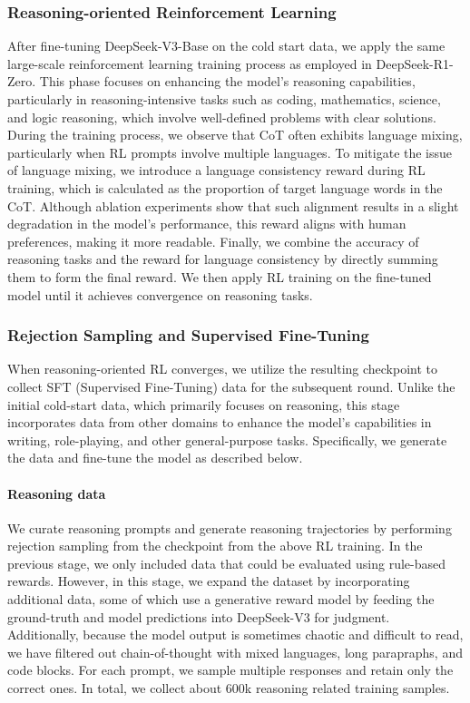 \documentclass[11pt, a4paper, logo, copyright, nonumbering]{deepseek}
\newcommand{\dsro}{DeepSeek-R1-Zero}
\begin{document}
\subsubsection{Reasoning-oriented Reinforcement Learning}
After fine-tuning DeepSeek-V3-Base on the cold start data, we apply the same large-scale reinforcement learning training process as employed in \dsro. This phase focuses on enhancing the model's reasoning capabilities, particularly in reasoning-intensive tasks such as coding, mathematics, science, and logic reasoning, which involve well-defined problems with clear solutions. During the training process, we observe that CoT often exhibits language mixing, particularly when RL prompts involve multiple languages. To mitigate the issue of language mixing, we introduce a language consistency reward during RL training, which is calculated as the proportion of target language words in the CoT. Although ablation experiments show that such alignment results in a slight degradation in the model's performance, this reward aligns with human preferences, making it more readable. Finally, we combine the accuracy of reasoning tasks and the reward for language consistency by directly summing them to form the final reward. We then apply RL training on the fine-tuned model until it achieves convergence on reasoning tasks.

\subsubsection{Rejection Sampling and Supervised Fine-Tuning}
When reasoning-oriented RL converges, we utilize the resulting checkpoint to collect SFT (Supervised Fine-Tuning) data for the subsequent round. Unlike the initial cold-start data, which primarily focuses on reasoning, this stage incorporates data from other domains to enhance the model's capabilities in writing, role-playing, and other general-purpose tasks. Specifically, we generate the data and fine-tune the model as described below.
\label{sec:method:r1:sft}


\paragraph{Reasoning data}
We curate reasoning prompts and generate reasoning trajectories by performing rejection sampling from the checkpoint from the above RL training.
In the previous stage, we only included data that could be evaluated using rule-based rewards. However, in this stage, we expand the dataset by incorporating additional data, some of which use a generative reward model by feeding the ground-truth and model predictions into DeepSeek-V3 for judgment.
Additionally, because the model output is sometimes chaotic and difficult to read, we have filtered out chain-of-thought with mixed languages, long parapraphs, and code blocks.
For each prompt, we sample multiple responses and retain only the correct ones. In total, we collect about 600k reasoning related training samples. 
\end{document}
